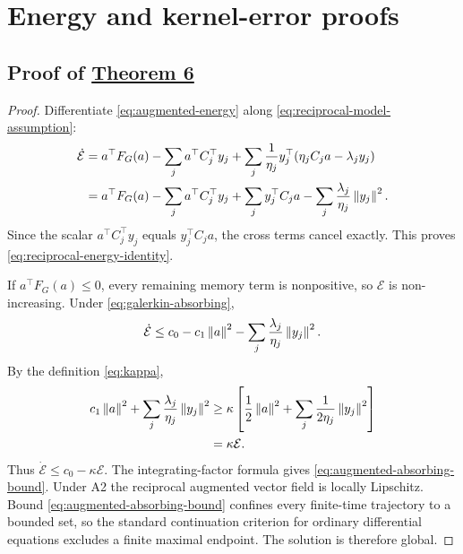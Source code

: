 \section{Energy and kernel-error proofs}
\label{app:energy-kernel}

\subsection{Proof of \hyperref[thm:reciprocal-energy]{Theorem 6}}
\label{app:reciprocal-energy}

\begin{proof}
Differentiate \eqref{eq:augmented-energy} along
\eqref{eq:reciprocal-model-assumption}:
\begin{align}
 \dot{\mathcal E}
 &=a^\top F_G(a)
 -\sum_j a^\top C_j^\top y_j
 +\sum_j\frac1{\eta_j}
 y_j^\top(\eta_jC_ja-\lambda_jy_j) \notag\\
 &=a^\top F_G(a)
 -\sum_j a^\top C_j^\top y_j
 +\sum_j y_j^\top C_ja
 -\sum_j\frac{\lambda_j}{\eta_j}\left\lVert y_j\right\rVert^2.
 \label{eq:energy-before-cancel}
\end{align}
Since the scalar $a^\top C_j^\top y_j$ equals
$y_j^\top C_ja$, the cross terms cancel exactly. This proves
\eqref{eq:reciprocal-energy-identity}.

If $a^\top F_G(a)\le0$, every remaining memory term is nonpositive, so
$\mathcal E$ is non-increasing. Under \eqref{eq:galerkin-absorbing},
\begin{equation}
 \dot{\mathcal E}
 \le c_0-c_1\left\lVert a\right\rVert^2
 -\sum_j\frac{\lambda_j}{\eta_j}\left\lVert y_j\right\rVert^2.
 \label{eq:energy-absorbing-step}
\end{equation}
By the definition \eqref{eq:kappa},
\begin{align}
 c_1\left\lVert a\right\rVert^2
 +\sum_j\frac{\lambda_j}{\eta_j}\left\lVert y_j\right\rVert^2
 &\ge
 \kappa\left[
 \frac12\left\lVert a\right\rVert^2+
 \sum_j\frac{1}{2\eta_j}\left\lVert y_j\right\rVert^2
 \right] \notag\\
 &=\kappa\mathcal E.
 \label{eq:kappa-coercivity}
\end{align}
Thus $\dot{\mathcal E}\le c_0-\kappa\mathcal E$. The integrating-factor
formula gives \eqref{eq:augmented-absorbing-bound}. Under A2 the reciprocal
augmented vector field is locally Lipschitz. Bound
\eqref{eq:augmented-absorbing-bound} confines every finite-time trajectory
to a bounded set, so the standard continuation criterion for ordinary
differential equations excludes a finite maximal endpoint. The solution is
therefore global.
\end{proof}

